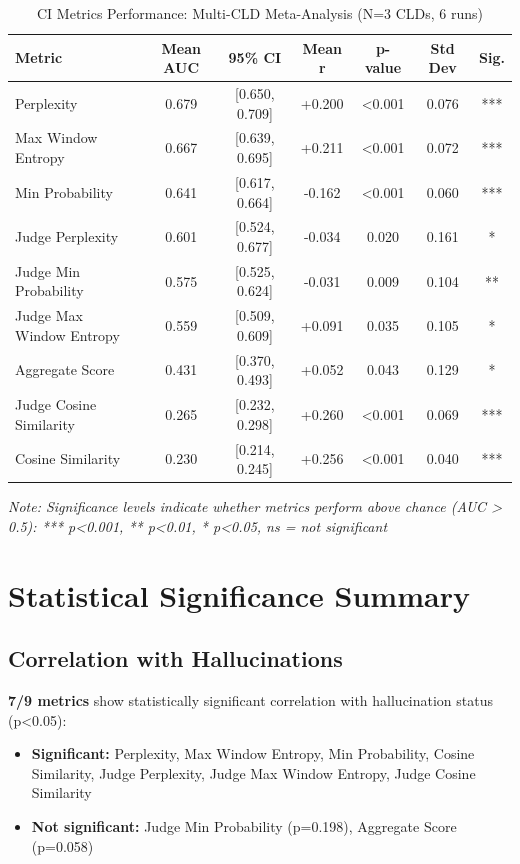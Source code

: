 \begin{table}[h]
\centering
\small
\caption{CI Metrics Performance: Multi-CLD Meta-Analysis (N=3 CLDs, 6 runs)}
\label{tab:rq2_aggregate_all_metrics}
\begin{tabular}{lcccccc}
\toprule
\textbf{Metric} & \textbf{Mean AUC} & \textbf{95\% CI} & \textbf{Mean r} & \textbf{p-value} & \textbf{Std Dev} & \textbf{Sig.} \\
\midrule
Perplexity                & 0.679 & [0.650, 0.709] & +0.200 & <0.001 & 0.076 & *** \\
Max Window Entropy        & 0.667 & [0.639, 0.695] & +0.211 & <0.001 & 0.072 & *** \\
Min Probability           & 0.641 & [0.617, 0.664] & -0.162 & <0.001 & 0.060 & *** \\
Judge Perplexity          & 0.601 & [0.524, 0.677] & -0.034 & 0.020  & 0.161 & *   \\
Judge Min Probability     & 0.575 & [0.525, 0.624] & -0.031 & 0.009  & 0.104 & **  \\
Judge Max Window Entropy  & 0.559 & [0.509, 0.609] & +0.091 & 0.035  & 0.105 & *   \\
Aggregate Score           & 0.431 & [0.370, 0.493] & +0.052 & 0.043  & 0.129 & *   \\
Judge Cosine Similarity   & 0.265 & [0.232, 0.298] & +0.260 & <0.001 & 0.069 & *** \\
Cosine Similarity         & 0.230 & [0.214, 0.245] & +0.256 & <0.001 & 0.040 & *** \\
\bottomrule
\end{tabular}
\end{table}

\textit{Note: Significance levels indicate whether metrics perform above chance (AUC > 0.5): *** p<0.001, ** p<0.01, * p<0.05, ns = not significant}

\section{Statistical Significance Summary}

\subsection{Correlation with Hallucinations}

\textbf{7/9 metrics} show statistically significant correlation with hallucination status (p<0.05):
\begin{itemize}
    \item \textbf{Significant:} Perplexity, Max Window Entropy, Min Probability, Cosine Similarity, Judge Perplexity, Judge Max Window Entropy, Judge Cosine Similarity
    \item \textbf{Not significant:} Judge Min Probability (p=0.198), Aggregate Score (p=0.058)
\end{itemize}

